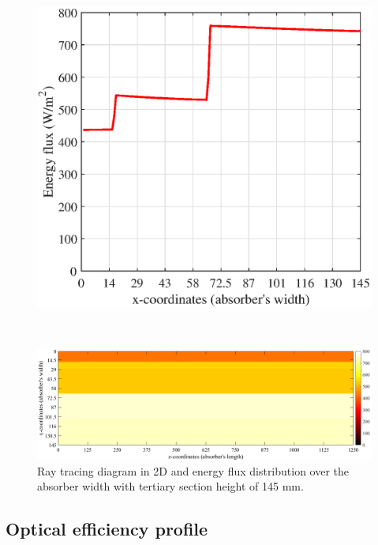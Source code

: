 \begin{figure}[ht!]
\begin{minipage}{0.48\columnwidth}
	\end{minipage}
	\begin{minipage}{0.48\columnwidth}
		\includegraphics[scale=0.45]{figs/Energy2D-hts145.eps}
	\end{minipage}
	\\[3mm]
	\begin{minipage}{1.0\columnwidth}
		\includegraphics[scale=0.40]{figs/Energy3D-hts145.png}
	\end{minipage}
	
	\caption{Ray tracing diagram in 2D and energy flux distribution over the absorber width with tertiary section height of 145 mm.}
	\label{Tertiary-hts145}
\end{figure}

\subsection{Optical efficiency profile}

